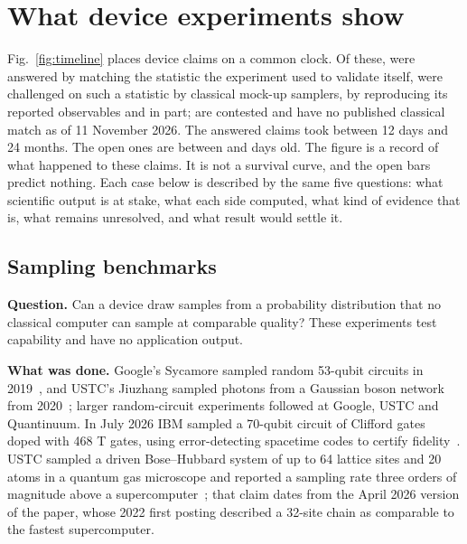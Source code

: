 \section{What device experiments show}
\label{sec:devices}



Fig.~\ref{fig:timeline} places \nTimeline{} device claims on a common clock. Of these, \wTLvalidation{} were answered by matching the statistic the experiment used to validate itself, \wTLchallenged{} were challenged on such a statistic by classical mock-up samplers, \wTLobservables{} by reproducing its reported observables and \wTLpartial{} in part; \wTLcontested{} are contested and \wTLopen{} have no published classical match as of 11 November 2026. The answered claims took between 12 days and 24 months. The open ones are between  and  days old. The figure is a record of what happened to these claims. It is not a survival curve, and the open bars predict nothing. Each case below is described by the same five questions: what scientific output is at stake, what each side computed, what kind of evidence that is, what remains unresolved, and what result would settle it.

\subsection{Sampling benchmarks}
\textbf{Question.} Can a device draw samples from a probability distribution that no classical computer can sample at comparable quality? These experiments test capability and have no application output.

\textbf{What was done.} Google's Sycamore sampled random 53-qubit circuits in 2019~\cite{arute2019}, and USTC's Jiuzhang sampled photons from a Gaussian boson network from 2020~\cite{zhong2020}; larger random-circuit experiments followed at Google, USTC and Quantinuum. In July 2026 IBM sampled a 70-qubit circuit of Clifford gates doped with 468 T gates, using error-detecting spacetime codes to certify fidelity~\cite{martiel2026}. USTC sampled a driven Bose--Hubbard system of up to 64 lattice sites and 20 atoms in a quantum gas microscope and reported a sampling rate three orders of magnitude above a supercomputer~\cite{zheng2026}; that claim dates from the April 2026 version of the paper, whose 2022 first posting described a 32-site chain as comparable to the fastest supercomputer.

